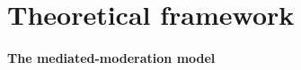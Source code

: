 \documentclass[	
	12pt, %
	a4paper, %
  abstracton
]{scrartcl}\usepackage[]{graphicx}\usepackage[]{color}
\begin{document}


\section*{Theoretical framework}
\paragraph{The mediated-moderation model}


\end{document}
